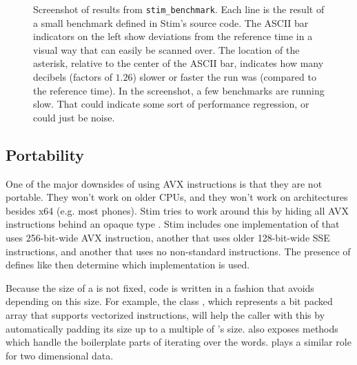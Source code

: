 \documentclass[onecolumn,unpublished]{quantumarticle}
\theoremstyle{definition}
\theoremstyle{definition}
\theoremstyle{definition}
\begin{document}
\begin{figure}
    \centering
    \caption{
        Screenshot of results from \texttt{stim\_benchmark}.
        Each line is the result of a small benchmark defined in Stim's source code.
        The ASCII bar indicators on the left show deviations from the reference time in a visual way that can easily be scanned over.
        The location of the asterisk, relative to the center of the ASCII bar, indicates how many decibels (factors of $1.26$) slower or faster the run was (compared to the reference time).
        In the screenshot, a few benchmarks are running slow.
        That could indicate some sort of performance regression, or could just be noise.
    }
    \label{fig:stim-benchmark-output}
\end{figure}


\subsection{Portability}

One of the major downsides of using AVX instructions is that they are not portable.
They won't work on older CPUs, and they won't work on architectures besides x64 (e.g. most phones).
Stim tries to work around this by hiding all AVX instructions behind an opaque type .
Stim includes one implementation of  that uses 256-bit-wide AVX instruction, another that uses older 128-bit-wide SSE instructions, and another that uses no non-standard instructions.
The presence of defines like  then determine which  implementation is used.

Because the size of a  is not fixed, code is written in a fashion that avoids depending on this size.
For example, the class , which represents a bit packed array that supports vectorized instructions, will help the caller with this by automatically padding its size up to a multiple of 's size.
 also exposes methods which handle the boilerplate parts of iterating over the words.
 plays a similar role for two dimensional data.
\end{document}
